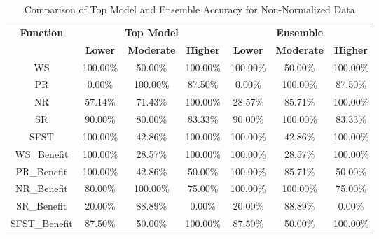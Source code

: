 \begin{table}[H]
\centering
\begin{tabular}{|c|c|c|c|c|c|c|}
\hline
\multirow{2}{*}{\textbf{Function}} & \multicolumn{3}{c|}{\textbf{Top Model}} & \multicolumn{3}{c|}{\textbf{Ensemble}} \\
\cline{2-7}
 & \textbf{Lower} & \textbf{Moderate} & \textbf{Higher} & \textbf{Lower} & \textbf{Moderate} & \textbf{Higher} \\
\hline
WS & 100.00\% & 50.00\% & 100.00\% & 100.00\% & 50.00\% & 100.00\% \\
\hline
PR & 0.00\% & 100.00\% & 87.50\% & 0.00\% & 100.00\% & 87.50\% \\
\hline
NR & 57.14\% & 71.43\% & 100.00\% & 28.57\% & 85.71\% & 100.00\% \\
\hline
SR & 90.00\% & 80.00\% & 83.33\% & 90.00\% & 100.00\% & 83.33\% \\
\hline
SFST & 100.00\% & 42.86\% & 100.00\% & 100.00\% & 42.86\% & 100.00\% \\
\hline
WS\_Benefit & 100.00\% & 28.57\% & 100.00\% & 100.00\% & 28.57\% & 100.00\% \\
\hline
PR\_Benefit & 100.00\% & 42.86\% & 50.00\% & 100.00\% & 85.71\% & 50.00\% \\
\hline
NR\_Benefit & 80.00\% & 100.00\% & 75.00\% & 100.00\% & 100.00\% & 75.00\% \\
\hline
SR\_Benefit & 20.00\% & 88.89\% & 0.00\% & 20.00\% & 88.89\% & 0.00\% \\
\hline
SFST\_Benefit & 87.50\% & 50.00\% & 100.00\% & 87.50\% & 50.00\% & 100.00\% \\
\hline
\end{tabular}
\caption{Comparison of Top Model and Ensemble Accuracy for Non-Normalized Data}
\label{reg_all_tab:featred_non_norm_accuracy}
\end{table}

